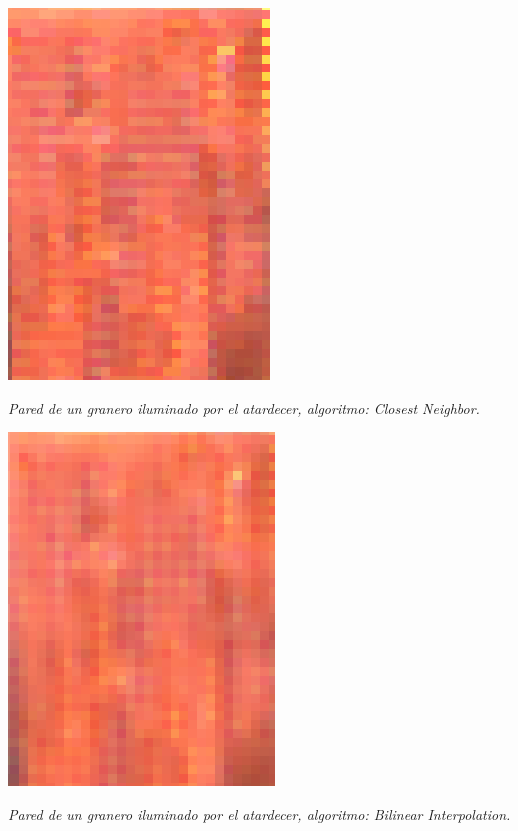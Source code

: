 	\begin{center}
		\includegraphics[scale=.5]{../enunciado/images_files/cualitativo/farm_closest.png}
		\vspace{2pt}
		\par
		\footnotesize\textit{Pared de un granero iluminado por el atardecer, algoritmo: Closest Neighbor.}
	\end{center}


	\begin{center}
		\includegraphics[scale=.5]{../enunciado/images_files/cualitativo/farm_bilinear.png}
		\vspace{2pt}
		\par
		\footnotesize\textit{Pared de un granero iluminado por el atardecer, algoritmo: Bilinear Interpolation.}
	\end{center}


